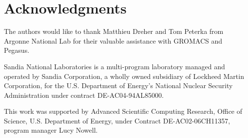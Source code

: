 \documentclass[conference]{IEEEtran}
\begin{document}

\maketitle








%
%
%
%


\section*{Acknowledgments}
The authors would like to thank Matthieu Dreher
and Tom Peterka from Argonne National Lab for their
valuable assistance with GROMACS and Pegasus.

Sandia National Laboratories is a multi-program laboratory managed and operated
by Sandia Corporation, a wholly owned subsidiary of Lockheed Martin
Corporation, for the U.S. Department of Energy's National Nuclear Security
Administration under contract DE-AC04-94AL85000.

This work was supported by Advanced Scientific Computing Research, Office of
Science, U.S. Department of Energy, under Contract DE-AC02-06CH11357, program
manager Lucy Nowell.




\vfill\eject
\end{document}
